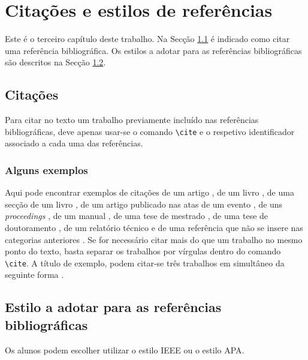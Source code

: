 
\chapter{Citações e estilos de referências}
\label{cap3}

Este é o terceiro capítulo deste trabalho. 
Na Secção \ref{cap3:citacoes} é indicado como citar uma referência bibliográfica. Os estilos a adotar para as referências bibliográficas são descritos na Secção \ref{cap3:estilosRef}.

\section{Citações}
\label{cap3:citacoes}
    
    Para citar no texto um trabalho previamente incluído nas referências bibliográficas, deve apenas usar-se o comando \verb|\cite| e o respetivo identificador associado a cada uma das referências. 
    
    \subsection{Alguns exemplos}
    
    Aqui pode encontrar exemplos de citações de um artigo \cite{Cohen:1963}, de um livro \cite{CitekeyBook}, de uma secção de um livro \cite{CitekeyInbook}, de um artigo publicado nas atas de um evento \cite{CitekeyInproceedings}, de uns \textit{proceedings} \cite{CitekeyProceedings}, de um manual \cite{CitekeyManual}, de uma tese de mestrado \cite{CitekeyMastersthesis}, de uma tese de doutoramento \cite{CitekeyPhdthesis}, de um relatório técnico \cite{CitekeyTechreport}  
    e de uma referência que não se insere nas categorias anteriores \cite{CitekeyMisc}.
    Se for necessário citar mais do que um trabalho no mesmo ponto do texto, basta separar os trabalhos por vírgulas dentro do comando \verb|\cite|. A título de exemplo, podem citar-se três trabalhos em simultâneo da seguinte forma \cite{Cohen:1963, CitekeyBook,CitekeyInbook}.

\section{Estilo a adotar para as referências bibliográficas}
    \label{cap3:estilosRef}
    
    Os alunos podem escolher utilizar o estilo IEEE ou o estilo APA.
    
